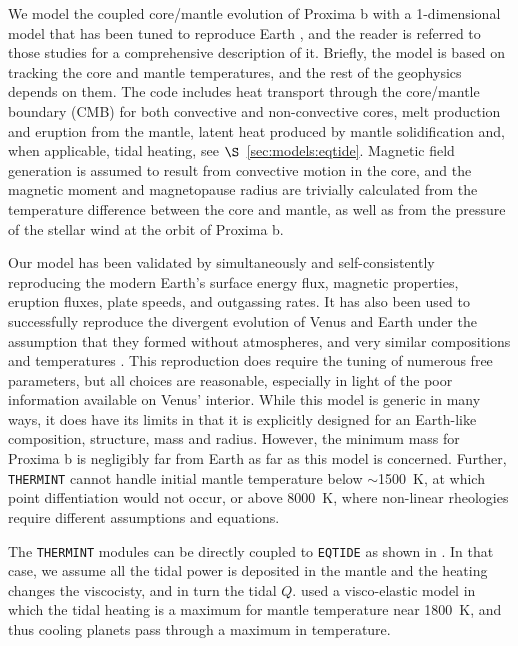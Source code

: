 \documentclass[preprint,12pt]{aastex}
\def\eqtide{\texttt{\footnotesize{EQTIDE}}\xspace}
\def\thermint{\texttt{\footnotesize{THERMINT}}\xspace}
\begin{document}
We model the coupled core/mantle evolution of Proxima b with a
1-dimensional model that has been tuned to reproduce Earth
\citep{DriscollOlson11,DriscollBercovici13,DriscollBercovici14,DriscollBarnes15}, and the
reader is referred to those studies for a comprehensive description of
it. Briefly, the model is based on tracking the core and mantle
temperatures, and the rest of the geophysics depends on them. The code
includes heat transport through the core/mantle boundary (CMB) for
both convective and non-convective cores, melt production and eruption
from the mantle, latent heat produced by mantle solidification and,
when applicable, tidal heating, see $\S$~\ref{sec:models:eqtide}. Magnetic field
generation is assumed to result from convective motion in the core,
and the magnetic moment and magnetopause radius are trivially
calculated from the temperature difference between the core and
mantle, as well as from the pressure of the stellar wind at the orbit
of Proxima b.

Our model has been validated by simultaneously and self-consistently
reproducing the modern Earth's surface energy flux, magnetic
properties, eruption fluxes, plate speeds, and outgassing rates. It
has also been used to successfully reproduce the divergent evolution
of Venus and Earth under the assumption that they formed without
atmospheres, and very similar compositions and temperatures
\citep{DriscollBercovici13}. This reproduction does require the tuning of
numerous free parameters, but all choices are reasonable, especially
in light of the poor information available on Venus' interior. While
this model is generic in many ways, it does have its limits in that it is
explicitly designed for an Earth-like composition, structure, mass and
radius. However, the minimum mass for Proxima b is negligibly far from
Earth as far as this model is concerned. Further, \thermint cannot
handle initial mantle temperature below $\sim$1500~K, at which point
diffentiation would not occur, or above 8000~K, where non-linear
rheologies require different assumptions and equations.

The \thermint modules can be directly coupled to \eqtide as shown in
\citep{DriscollBarnes15}. In that case, we assume all the tidal power
is deposited in the mantle and the heating changes the viscocisty, and
in turn the tidal $Q$. \cite{DriscollBarnes15} used a visco-elastic
model in which the tidal heating is a maximum for mantle temperature
near 1800~K, and thus cooling planets pass through a maximum in
temperature.
\end{document}
